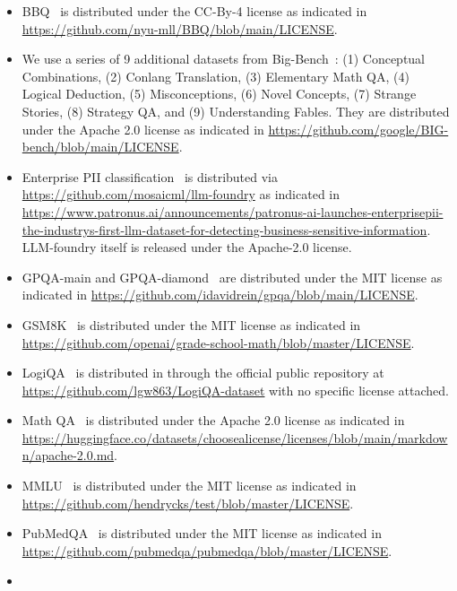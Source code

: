 \documentclass{article}
\begin{document}
\begin{itemize}
    AQuA~\citep{ling2017program}  is distributed under the Apache 2.0 license as indicated in \url{https://github.com/google-deepmind/AQuA/blob/master/LICENSE}.
    \item
    BBQ~\citep{bbq} is distributed under the CC-By-4 license as indicated in \url{https://github.com/nyu-mll/BBQ/blob/main/LICENSE}.
    \item
    We use a series of 9 additional datasets from Big-Bench~\citep{srivastava2023beyond}: (1) Conceptual Combinations, (2) Conlang Translation, (3) Elementary Math QA, (4) Logical Deduction, (5) Misconceptions, (6) Novel Concepts, (7) Strange Stories, (8) Strategy QA, and (9) Understanding Fables. They are distributed under the Apache 2.0 license as indicated in \url{https://github.com/google/BIG-bench/blob/main/LICENSE}.
    \item
    Enterprise PII classification~\citep{patronusPatronusPatronus} is distributed via \url{https://github.com/mosaicml/llm-foundry} as indicated in \url{https://www.patronus.ai/announcements/patronus-ai-launches-enterprisepii-the-industrys-first-llm-dataset-for-detecting-business-sensitive-information}. LLM-foundry itself is released under the Apache-2.0 license.
    \item
    GPQA-main and GPQA-diamond~\citep{rein2023gpqa} are distributed under the MIT license as indicated in \url{https://github.com/idavidrein/gpqa/blob/main/LICENSE}.
    \item
    GSM8K~\citep{gsm8k} is distributed under the MIT license as indicated in \url{https://github.com/openai/grade-school-math/blob/master/LICENSE}.
    \item
    LogiQA~\citep{Liu2020LogiQAAC}  is distributed in through the official public repository at \url{https://github.com/lgw863/LogiQA-dataset} with no specific license attached.
    \item
    Math QA~\citep{mathqa}  is distributed under the Apache 2.0 license as indicated in \url{https://huggingface.co/datasets/choosealicense/licenses/blob/main/markdown/apache-2.0.md}.
    \item
    MMLU~\citep{mmlu} is distributed under the MIT license as indicated in \url{https://github.com/hendrycks/test/blob/master/LICENSE}.
    \item
    PubMedQA~\citep{pubmed} is distributed under the MIT license as indicated in \url{https://github.com/pubmedqa/pubmedqa/blob/master/LICENSE}.
    \item

\end{itemize}
\end{document}

